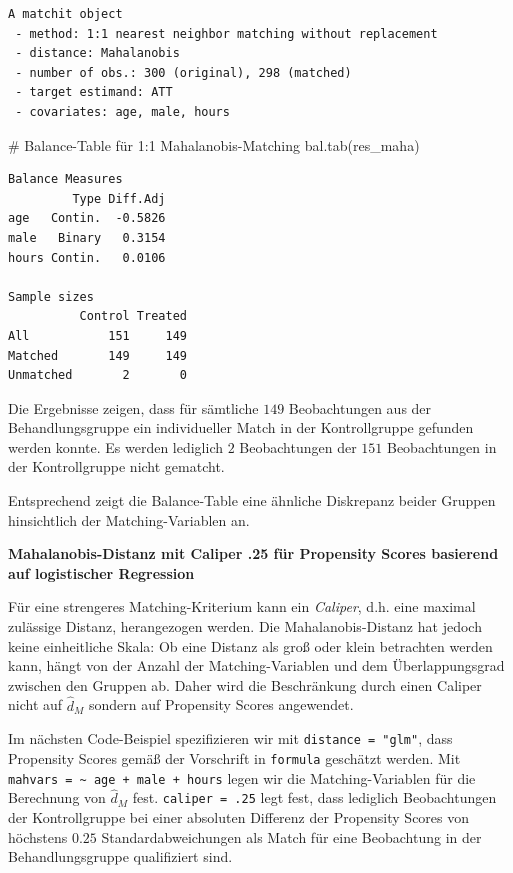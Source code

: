 \documentclass[
  a4paper,
  DIV=11,
  oneside]{scrreprt}
\newenvironment{Shaded}{\begin{snugshade}}{\end{snugshade}}
\newcommand{\CommentTok}[1]{\textcolor[rgb]{0.37,0.37,0.37}{#1}}
\newcommand{\FunctionTok}[1]{\textcolor[rgb]{0.28,0.35,0.67}{#1}}
\newcommand{\NormalTok}[1]{\textcolor[rgb]{0.00,0.23,0.31}{#1}}
\begin{document}
\begin{verbatim}
A matchit object
 - method: 1:1 nearest neighbor matching without replacement
 - distance: Mahalanobis
 - number of obs.: 300 (original), 298 (matched)
 - target estimand: ATT
 - covariates: age, male, hours
\end{verbatim}

\begin{Shaded}
\begin{Highlighting}[]
\CommentTok{\# Balance{-}Table für 1:1 Mahalanobis{-}Matching}
\FunctionTok{bal.tab}\NormalTok{(res\_maha)}
\end{Highlighting}
\end{Shaded}

\begin{verbatim}
Balance Measures
         Type Diff.Adj
age   Contin.  -0.5826
male   Binary   0.3154
hours Contin.   0.0106

Sample sizes
          Control Treated
All           151     149
Matched       149     149
Unmatched       2       0
\end{verbatim}

Die Ergebnisse zeigen, dass für sämtliche \(149\) Beobachtungen aus der
Behandlungsgruppe ein individueller Match in der Kontrollgruppe gefunden
werden konnte. Es werden lediglich \(2\) Beobachtungen der \(151\)
Beobachtungen in der Kontrollgruppe nicht gematcht.

Entsprechend zeigt die Balance-Table eine ähnliche Diskrepanz beider
Gruppen hinsichtlich der Matching-Variablen an.

\textbf{Mahalanobis-Distanz mit Caliper .25 für Propensity Scores
basierend auf logistischer Regression}

Für eine strengeres Matching-Kriterium kann ein \emph{Caliper}, d.h.
eine maximal zulässige Distanz, herangezogen werden. Die
Mahalanobis-Distanz hat jedoch keine einheitliche Skala: Ob eine Distanz
als groß oder klein betrachten werden kann, hängt von der Anzahl der
Matching-Variablen und dem Überlappungsgrad zwischen den Gruppen ab.
Daher wird die Beschränkung durch einen Caliper nicht auf
\(\widehat{d}_M\) sondern auf Propensity Scores angewendet.

Im nächsten Code-Beispiel spezifizieren wir mit
\texttt{distance\ =\ "glm"}, dass Propensity Scores gemäß der Vorschrift
in \texttt{formula} geschätzt werden. Mit
\texttt{mahvars\ =\ \textasciitilde{}\ age\ +\ male\ +\ hours} legen wir
die Matching-Variablen für die Berechnung von \(\widehat{d}_M\) fest.
\texttt{caliper\ =\ .25} legt fest, dass lediglich Beobachtungen der
Kontrollgruppe bei einer absoluten Differenz der Propensity Scores von
höchstens \(0.25\) Standardabweichungen als Match für eine Beobachtung
in der Behandlungsgruppe qualifiziert sind.
\end{document}
